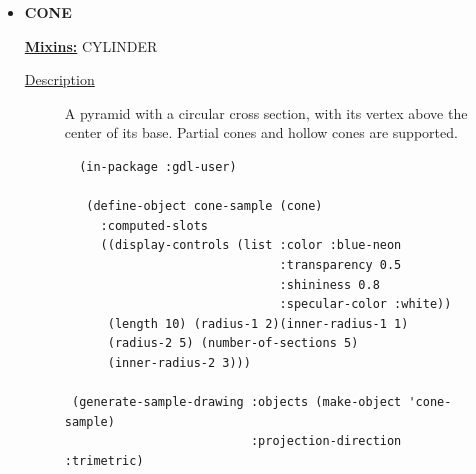 \documentclass [11pt]{book}
\begin{document}
\begin{itemize}







\item {}
\label{prim:cone}
\textbf{CONE}


\textbf{
\underline{Mixins:}} CYLINDER





\begin{description}

\item [
\underline{Description}]


A pyramid with a circular cross section, with its vertex above 
the center of its base. Partial cones and hollow cones are supported.



\end{description}




\begin{figure}
\begin{lrbox}{\boxedverb}
\begin{minipage}{\linewidth}
{\small

\begin{verbatim}
  (in-package :gdl-user)

   (define-object cone-sample (cone)
     :computed-slots
     ((display-controls (list :color :blue-neon 
                              :transparency 0.5 
                              :shininess 0.8 
                              :specular-color :white))
      (length 10) (radius-1 2)(inner-radius-1 1)
      (radius-2 5) (number-of-sections 5)
      (inner-radius-2 3)))
  
 (generate-sample-drawing :objects (make-object 'cone-sample) 
                          :projection-direction :trimetric) 
  

\end{verbatim}}
\end{minipage}
\end{lrbox}
\end{figure}
\end{itemize}
\end{document}
